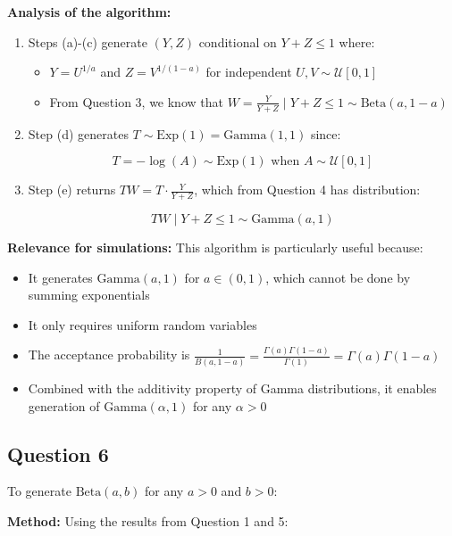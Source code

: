 \textbf{Analysis of the algorithm:}
\begin{enumerate}
    \item Steps (a)-(c) generate $(Y, Z)$ conditional on $Y + Z \leq 1$ where:
   \begin{itemize}
    \item $Y = U^{1/a}$ and $Z = V^{1/(1-a)}$ for independent $U, V \sim \mathcal{U}[0,1]$
    \item From Question 3, we know that $W = \frac{Y}{Y+Z} \mid Y+Z \leq 1 \sim \text{Beta}(a,1-a)$
    \end{itemize}
    \item Step (d) generates $T \sim \text{Exp}(1) = \text{Gamma}(1,1)$ since:

 $$T = -\log(A) \sim \text{Exp}(1) \text{ when } A \sim \mathcal{U}[0,1]$$
\item Step (e) returns $TW = T \cdot \frac{Y}{Y+Z}$, which from Question 4 has distribution:

 $$TW \mid Y+Z \leq 1 \sim \text{Gamma}(a, 1)$$
\end{enumerate}

\textbf{Relevance for simulations:}
This algorithm is particularly useful because:
\begin{itemize}
    \item It generates $\text{Gamma}(a,1)$ for $a \in (0,1)$, which cannot be done by summing exponentials
    \item It only requires uniform random variables
    \item The acceptance probability is $\frac{1}{B(a,1-a)} = \frac{\Gamma(a)\Gamma(1-a)}{\Gamma(1)} = \Gamma(a)\Gamma(1-a)$
    \item Combined with the additivity property of Gamma distributions, it enables generation of $\text{Gamma}(\alpha,1)$ for any $\alpha > 0$
\end{itemize}

\subsection*{Question 6}

To generate $\text{Beta}(a,b)$ for any $a > 0$ and $b > 0$:

\textbf{Method:} Using the results from Question 1 and 5:

